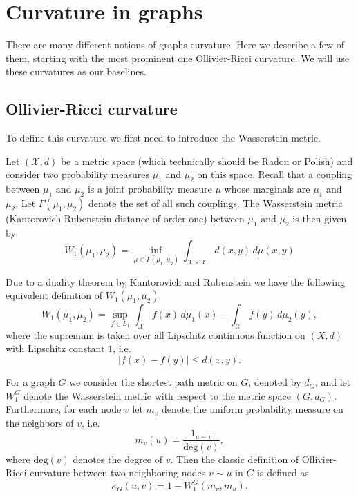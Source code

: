 \documentclass{article}
\begin{document}
\section{Curvature in graphs}

There are many different notions of graphs curvature. Here we describe a few of them, starting with the most prominent one Ollivier-Ricci curvature. We will use these curvatures as our baselines.

\subsection{Ollivier-Ricci curvature}

To define this curvature we first need to introduce the Wasserstein metric.

Let $(\mathcal{X},d)$ be a metric space (which technically should be Radon or Polish) and consider two probability measures $\mu_1$ and $\mu_2$ on this space. Recall that a coupling between $\mu_1$ and $\mu_2$ is a joint probability measure $\mu$ whose marginals are $\mu_1$ and $\mu_2$. Let $\Gamma(\mu_1, \mu_2)$ denote the set of all such couplings. The Wasserstein metric (Kantorovich-Rubenstein distance of order one) between $\mu_1$ and $\mu_2$ is then given by
\begin{equation}\label{eq:def_wasserstein_inf}
	W_1(\mu_1, \mu_2) = \inf_{\mu \in \Gamma(\mu_1, \mu_2)} \int_{\mathcal{X} \times \mathcal{X}} d(x,y) \, d\mu(x,y)
\end{equation}

Due to a duality theorem by Kantorovich and Rubenstein we have the following equivalent definition of $W_1(\mu_1, \mu_2)$
\begin{equation}\label{eq:def_wasserstein_sup}
	W_1(\mu_1, \mu_2) = \sup_{f \in L_1} \int_\mathcal{X} f(x) \, d\mu_1(x) - \int_\mathcal{X} f(y) \, d\mu_2(y),
\end{equation}
where the supremum is taken over all Lipschitz continuous function on $(X,d)$ with Lipschitz constant $1$, i.e.
\[
	|f(x) - f(y)| \le d(x,y).
\]

For a graph $G$ we consider the shortest path metric on $G$, denoted by $d_G$, and let $W_1^G$ denote the Wasserstein metric with respect to the metric space $(G,d_G)$. Furthermore, for each node $v$ let $m_v$ denote the uniform probability measure on the neighbors of $v$, i.e.
\[
	m_v(u) = \frac{1_{u \sim v}}{\mathrm{deg}(v)},
\]
where $\mathrm{deg}(v)$ denotes the degree of $v$. Then the classic definition of Ollivier-Ricci curvature between two neighboring nodes $v \sim u$ in $G$ is defined as
\begin{equation}\label{eq:def_classic_ollivier_graphs}
	\kappa_G(u,v) = 1 - W_1^G(m_v, m_u).
\end{equation}
\end{document}
